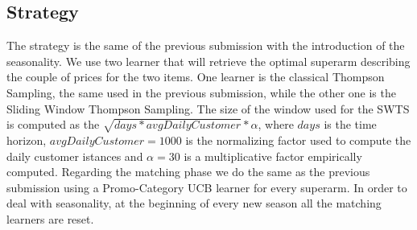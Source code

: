\subsection*{Strategy}
The strategy is the same of the previous submission with the introduction of the seasonality. We use two learner that will retrieve the optimal superarm describing the couple of prices for the two items. One learner is the classical Thompson Sampling, the same used in the previous submission, while the other one is the Sliding Window Thompson Sampling. The size of the window used for the SWTS is computed as the $\sqrt{days * avgDailyCustomer} * \alpha$, where $days$ is the time horizon, $avgDailyCustomer = 1000$ is the normalizing factor used to compute the daily customer istances and $\alpha = 30 $ is a multiplicative factor empirically computed. Regarding the matching phase we do the same as the previous submission using a Promo-Category UCB learner for every superarm. In order to deal with seasonality, at the beginning of every new season all the matching learners are reset.

